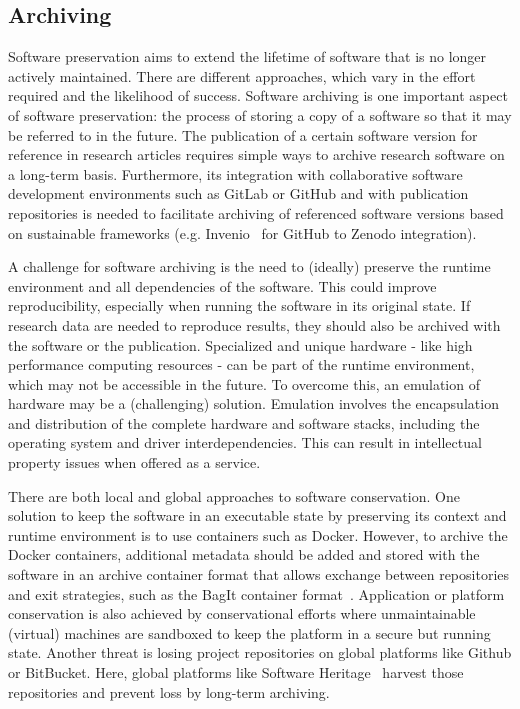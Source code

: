 \documentclass[a4paper,num-refs,numbers,sort&compress]{de-rse}
\begin{document}
\subsection{Archiving}
Software preservation aims to extend the lifetime of software that is no longer actively maintained. There are different approaches, which vary in the effort required and the likelihood of success. Software archiving is one important aspect of software preservation: the process of storing a copy of a software so that it may be referred to in the future.
The publication of a certain software version for reference in research articles requires simple ways to archive research software on a long-term basis. Furthermore, its integration with collaborative software development environments such as GitLab or GitHub and with publication repositories is needed to facilitate archiving of referenced software versions based on sustainable frameworks (e.g. Invenio~\cite{Invenio} for GitHub to Zenodo integration).

A challenge for software archiving is the need to (ideally) preserve the runtime environment and all dependencies of the software. This could improve reproducibility, especially when running the software in its original state. If research data are needed to reproduce results, they should also be archived with the software or the publication. Specialized and unique hardware - like high performance computing resources - can be part of the runtime environment, which may not be accessible in the future. To overcome this, an emulation of hardware may be a (challenging) solution. Emulation involves the encapsulation and distribution of the complete hardware and software stacks, including the operating system and driver interdependencies. This can result in intellectual property issues when offered as a service.

There are both local and global approaches to software conservation. One solution to keep the software in an executable state by preserving its context and runtime environment is to use containers such as Docker.
However, to archive the Docker containers, additional metadata should be added and stored with the software in an archive container format that allows exchange between repositories and exit strategies, such as the BagIt container format~\cite{kunze2018bagit}. Application or platform conservation is also achieved by conservational efforts where unmaintainable (virtual) machines are sandboxed to keep the platform in a secure but running state.
Another threat is losing project repositories on global platforms like Github or BitBucket. Here, global platforms like Software Heritage~\cite{swHeritage} harvest those repositories and prevent loss by long-term archiving.
\end{document}
